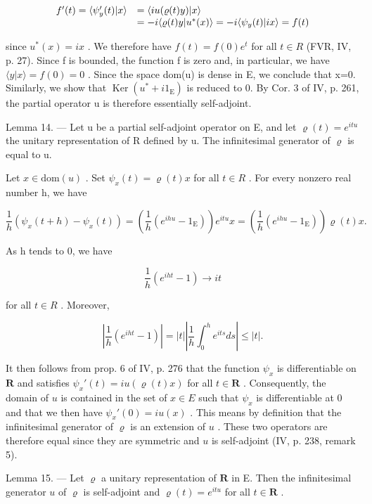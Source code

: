 \[
\begin{array}{r l} f ^ {\prime} (t) = \langle \psi_ {y} ^ {\prime} (t) | x \rangle & = \langle i u (\varrho (t) y) | x \rangle \\ & = - i \langle \varrho (t) y | u ^ {*} (x) \rangle = - i \langle \psi_ {y} (t) | i x \rangle = f (t) \end{array}
\]

since \(u^{*}(x)=ix\) . We therefore have \(f(t)=f(0)e^{t}\) for all \(t\in R\) (FVR, IV, p. 27). Since f is bounded, the function f is zero and, in particular, we have \(\langle y|x\rangle=f(0)=0\) . Since the space dom(u) is dense in E, we conclude that x=0. Similarly, we show that \(\operatorname{Ker}(u^{*}+i1_{\mathrm{E}})\) is reduced to 0. By Cor. 3 of IV, p. 261, the partial operator u is therefore essentially self-adjoint.

Lemma 14. --- Let u be a partial self-adjoint operator on E, and let \(\varrho(t) = e^{itu}\) the unitary representation of R defined by u. The infinitesimal generator of \(\varrho\) is equal to u.

Let \(x \in \text{dom}(u)\) . Set \(\psi_{x}(t) = \varrho(t)x\) for all \(t \in R\) . For every nonzero real number h, we have

\[
\frac {1}{h} \left(\psi_ {x} (t + h) - \psi_ {x} (t)\right) = \left(\frac {1}{h} \left(e ^ {i h u} - 1 _ {\mathrm{E}}\right)\right) e ^ {i t u} x = \left(\frac {1}{h} \left(e ^ {i h u} - 1 _ {\mathrm{E}}\right)\right) \varrho (t) x.
\]

As h tends to 0, we have

\[
\frac {1}{h} (e ^ {i h t} - 1) \rightarrow i t
\]

for all \(t \in R\) . Moreover,

\[
\left| \frac {1}{h} (e ^ {i h t} - 1) \right| = | t | \left| \frac {1}{h} \int_ {0} ^ {h} e ^ {i t s} d s \right| \leqslant | t |.
\]

It then follows from prop. 6 of IV, p. 276 that the function \(\psi_x\) is differentiable on \(\mathbf{R}\) and satisfies \(\psi_x'(t) = i u(\varrho(t)x)\) for all \(t \in \mathbf{R}\) . Consequently, the domain of \(u\) is contained in the set of \(x \in E\) such that \(\psi_x\) is differentiable at 0 and that we then have \(\psi_x'(0) = i u(x)\) . This means by definition that the infinitesimal generator of \(\varrho\) is an extension of \(u\) . These two operators are therefore equal since they are symmetric and \(u\) is self-adjoint (IV, p. 238, remark 5).

Lemma 15. --- Let \(\varrho\) a unitary representation of \(\mathbf{R}\) in E. Then the infinitesimal generator \(u\) of \(\varrho\) is self-adjoint and \(\varrho(t) = e^{itu}\) for all \(t \in \mathbf{R}\) .

